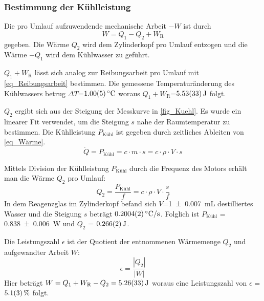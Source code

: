\documentclass[
	a4paper,
	12pt,
	pagesize,
	ngerman
]{scrartcl}
\begin{document}
	\subsubsection{Bestimmung der Kühlleistung} \label{sssec_Kühlleistung}
	Die pro Umlauf aufzuwendende mechanische Arbeit $-W$ ist durch
	\begin{equation}
	W =  Q_1 - Q_2 + W_\text{R}
	\end{equation}
	gegeben.
	Die Wärme $Q_2$ wird dem Zylinderkopf pro Umlauf entzogen und die Wärme $-Q_1$ wird dem Kühlwasser zu geführt.
	
	$Q_1+W_\text{R}$ lässt sich analog zur Reibungsarbeit pro Umlauf mit \cref{eq_Reibungsarbeit} bestimmen.	
	Die gemessene Temperaturänderung des Kühlwassers betrug $\Delta{T}$=$\SI{1,0+-0,05}{\degreeCelsius}$ woraus $Q_1+W_\text{R}$=$\SI{5,53+-0,33}{J}$ folgt.
	
	$Q_2$ ergibt sich aus der Steigung der Messkurve in \cref{fig_Kuehl}.
	Es wurde ein linearer Fit verwendet, um die Steigung $s$ nahe der Raumtemperatur zu bestimmen.
	Die Kühlleistung $P_\text{Kühl}$ ist gegeben durch zeitliches Ableiten von \cref{eq_Wärme}.
	\begin{equation}
	\dot{Q} = P_\text{Kühl} = c \cdot m \cdot s = c \cdot \rho \cdot V \cdot s 
	\label{eq_Kühlleistung}
	\end{equation}
	
	Mittels Division der Kühlleistung $P_\text{Kühl}$ durch die Frequenz des Motors erhält man die Wärme $Q_2$ pro Umlauf:
	\begin{equation}
	Q_2 = \frac{P_\text{Kühl}}{f} = c \cdot \rho \cdot V \cdot \frac{s}{f}	
	\end{equation}
	In dem Reagenzglas im Zylinderkopf befand sich $V$=\SI{1+- 0,007}{mL} destilliertes Wasser und die Steigung $s$ beträgt $\SI{0,2004+-0,0002}{\degreeCelsius/s}$.
	Folglich ist $P_\text{Kühl}$ = \SI{0,838+-0,006}{W} und $Q_2$ = $\SI{0,266+-0,002}{J}$.
	
	Die Leistungszahl $\epsilon$ ist der Quotient der entnommenen Wärmemenge $Q_2$ und aufgewandter Arbeit $W$:
	\begin{equation}
		\epsilon = \frac{|Q_2|}{|W|}
		\label{eq_Leistungszahl}
	\end{equation}
	Hier beträgt $W=Q_1+W_\text{R}-Q_2=\SI{5,26+-0,33}{J}$ woraus eine Leistungszahl von $\epsilon$ = $\SI{5,1 +- 0,3}{\%}$ folgt.
	
\end{document}
